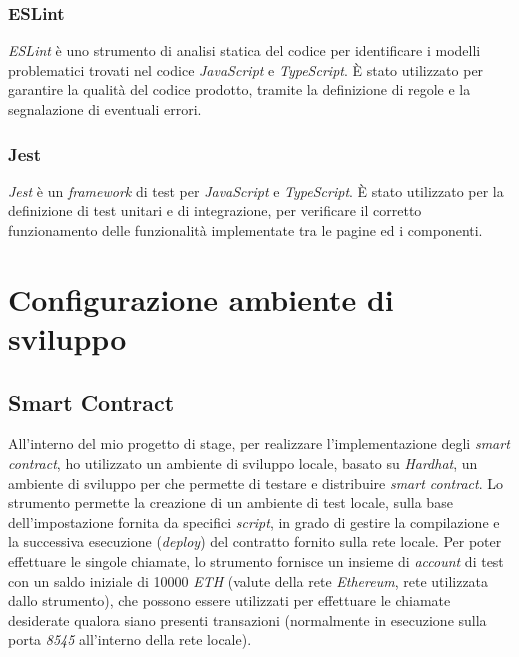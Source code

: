 \subsubsection{ESLint}\label{subsubsec:eslint}
\textit{ESLint} è uno strumento di analisi statica del codice per identificare i modelli problematici trovati nel codice \textit{JavaScript} e \textit{TypeScript}.
È stato utilizzato per garantire la qualità del codice prodotto, tramite la definizione di regole e la segnalazione di eventuali errori.

\subsubsection{Jest}\label{subsubsec:jest}
\textit{Jest} è un \textit{framework} di test per \textit{JavaScript} e \textit{TypeScript}. È stato utilizzato per la definizione di test unitari e di integrazione, per verificare il corretto funzionamento
delle funzionalità implementate tra le pagine ed i componenti.

\section{Configurazione ambiente di sviluppo}\label{sec:configurazione-ambiente}

\subsection{Smart Contract}\label{subsec:smart-contract}
All'interno del mio progetto di stage, per realizzare l'implementazione degli \textit{smart contract}, ho utilizzato un ambiente di sviluppo locale,
basato su \textit{Hardhat}, un ambiente di sviluppo per  che permette di testare e distribuire \textit{smart contract}.
Lo strumento permette la creazione di un ambiente di test locale, sulla base dell'impostazione fornita da specifici \textit{script}, in
grado di gestire la compilazione e la successiva esecuzione (\textit{deploy}) del contratto fornito sulla rete locale.
Per poter effettuare le singole chiamate, lo strumento fornisce un insieme di \textit{account} di test con un saldo iniziale di 10000 \textit{ETH} (valute della rete \textit{Ethereum}, rete  utilizzata dallo strumento), 
che possono essere utilizzati per effettuare le chiamate desiderate qualora siano presenti transazioni (normalmente in esecuzione sulla porta \textit{8545} all'interno della rete locale). \\

